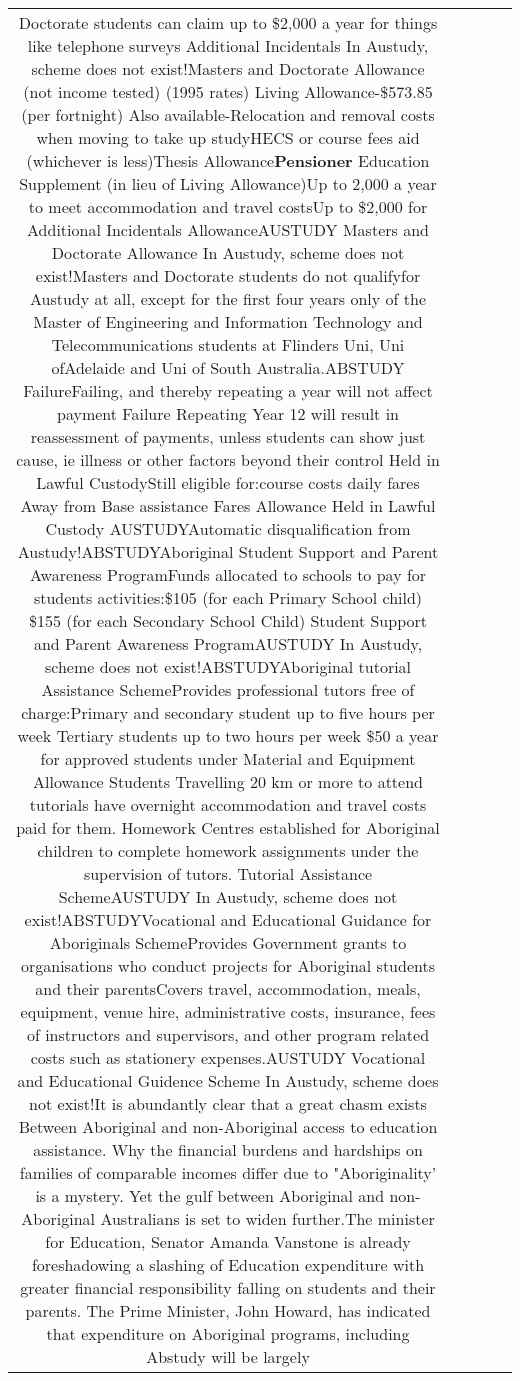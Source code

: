 \documentclass[11pt]{article}
\newlength\mylength
\begin{document}
\begin{center}
\begin{longtable}{|C{.65\mylength}|C{.30\mylength}|C{.12\mylength}|C{.12\mylength}|C{.12\mylength}|}
Doctorate students can claim up to \$2,000 a year for things like telephone surveys Additional Incidentals In Austudy, scheme does not exist!Masters and Doctorate Allowance (not income tested) (1995 rates) Living Allowance-\$573.85 (per fortnight) Also available-Relocation and removal costs when moving to take up studyHECS or course fees aid (whichever is less)Thesis Allowance\textbf{Pensioner} Education Supplement (in lieu of Living Allowance)Up to 2,000 a year to meet accommodation and travel costsUp to \$2,000 for Additional Incidentals AllowanceAUSTUDY Masters and Doctorate Allowance In Austudy, scheme does not exist!Masters and Doctorate students do not qualifyfor Austudy at all, except for the first four years only of the Master of Engineering and Information Technology and Telecommunications students at Flinders Uni, Uni ofAdelaide and Uni of South Australia.ABSTUDY FailureFailing, and thereby repeating a year will not affect payment Failure Repeating Year 12 will result in reassessment of payments, unless students can show just cause, ie illness or other factors beyond their control Held in Lawful CustodyStill eligible for:course costs daily fares Away from Base assistance Fares Allowance Held in Lawful Custody AUSTUDYAutomatic disqualification from Austudy!ABSTUDYAboriginal Student Support and Parent Awareness ProgramFunds allocated to schools to pay for students activities:\$105 (for each Primary School child) \$155 (for each Secondary School Child) Student Support and Parent Awareness ProgramAUSTUDY In Austudy, scheme does not exist!ABSTUDYAboriginal tutorial Assistance SchemeProvides professional tutors free of charge:Primary and secondary student up to five hours per week Tertiary students up to two hours per week \$50 a year for approved students under Material and Equipment Allowance Students Travelling 20 km or more to attend tutorials have overnight accommodation and travel costs paid for them. Homework Centres established for Aboriginal children to complete homework assignments under the supervision of tutors. Tutorial Assistance SchemeAUSTUDY In Austudy, scheme does not exist!ABSTUDYVocational and Educational Guidance for Aboriginals SchemeProvides Government grants to organisations who conduct projects for Aboriginal students and their parentsCovers travel, accommodation, meals, equipment, venue hire, administrative costs, insurance, fees of instructors and supervisors, and other program related costs such as stationery expenses.AUSTUDY Vocational and Educational Guidence Scheme In Austudy, scheme does not exist!It is abundantly clear that a great chasm exists Between Aboriginal and non-Aboriginal access to education assistance. Why the financial burdens and hardships on families of comparable incomes differ due to "Aboriginality' is a mystery. Yet the gulf between Aboriginal and non-Aboriginal Australians is set to widen further.The minister for Education, Senator Amanda Vanstone is already foreshadowing a slashing of Education expenditure with greater financial responsibility falling on students and their parents. The Prime Minister, John Howard, has indicated that expenditure on Aboriginal programs, including Abstudy will be largely 
\end{longtable}
\end{center}
\end{document}
